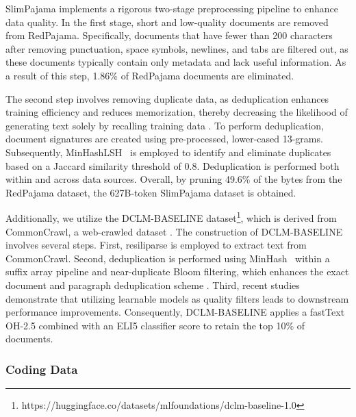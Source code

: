 SlimPajama implements a rigorous two-stage preprocessing pipeline to enhance data quality. In the first stage, short and low-quality documents are removed from RedPajama. Specifically, documents that have fewer than 200 characters after removing punctuation, space symbols, newlines, and tabs are filtered out, as these documents typically contain only metadata and lack useful information. As a result of this step, 1.86\% of RedPajama documents are eliminated.



The second step involves removing duplicate data, as deduplication enhances training efficiency and reduces memorization, thereby decreasing the likelihood of generating text solely by recalling training data \cite{penedo2023refinedweb, abbas2023semdedup, face2023, lee2021deduplicating, holtzman2019curious}. To perform deduplication, document signatures are created using pre-processed, lower-cased 13-grams. Subsequently, MinHashLSH~\cite{leskovec2014mining} is employed to identify and eliminate duplicates based on a Jaccard similarity threshold of 0.8. Deduplication is performed both within and across data sources. Overall, by pruning 49.6\% of the bytes from the RedPajama dataset, the 627B-token SlimPajama dataset is obtained.




Additionally, we utilize the DCLM-BASELINE \cite{li2024datacomp} dataset\footnote{https://huggingface.co/datasets/mlfoundations/dclm-baseline-1.0}, which is derived from CommonCrawl, a web-crawled dataset \cite{patel2020introduction}. The construction of DCLM-BASELINE involves several steps. First, resiliparse is employed to extract text from CommonCrawl. Second, deduplication is performed using MinHash~\cite{broder1997resemblance} within a suffix array pipeline \cite{fineweb2024, lee2021deduplicating} and near-duplicate Bloom filtering, which enhances the exact document and paragraph deduplication scheme \cite{soldaini2024dolma}. Third, recent studies \cite{brandfonbrener2024color, soldaini2024dolma, fang2023data} demonstrate that utilizing learnable models as quality filters leads to downstream performance improvements. Consequently, DCLM-BASELINE applies a fastText OH-2.5 combined with an ELI5 classifier score to retain the top 10\% of documents.



\subsubsection{Coding Data}

